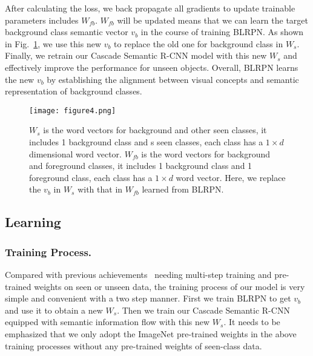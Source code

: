 \documentclass[runningheads]{llncs}
\begin{document}
After calculating the loss, we back propagate all gradients to update trainable parameters includes $W_{fb}$. $W_{fb}$ will be updated means that we can learn the target background class semantic vector $v_b$ in the course of training BLRPN. As shown in Fig.~\ref{fig:figure4}, we use this new $v_b$ to replace the old one for background class in $W_{s}$. Finally, we retrain our Cascade Semantic R-CNN model with this new $W_{s}$ and effectively improve the performance for unseen objects. Overall, BLRPN learns the new $v_b$ by establishing the alignment between visual concepts and semantic representation of background classes.
\begin{figure}[tbp]
\centering
\texttt{[image: figure4.png]}
\caption{$W_s$ is the word vectors for background and other seen classes, it includes 1 background class and s seen classes, each class has a $1 \times d$  dimensional word vector. $W_{fb}$ is the word vectors for background and foreground classes, it includes 1 background class and 1 foreground class, each class has a $1 \times d$ word vector. Here, we replace the $v_b$ in $W_s$ with that in $W_{fb}$ learned from BLRPN.}
\label{fig:figure4}
\end{figure}
\subsection{Learning}
\subsubsection{Training Process.}
Compared with previous achievements~\cite{bansal2018zero,demirel2018zero,rahman2018zero,zhu2019zero} needing multi-step training and pre-trained weights on seen or unseen data, the training process of our model is very simple and convenient with a two step manner. First we train BLRPN to get $v_b$ and use it to obtain a new $W_s$. Then we train our Cascade Semantic R-CNN equipped with semantic information flow with this new $W_s$. It needs to be emphasized that we only adopt the ImageNet pre-trained weights in the above training processes without any pre-trained weights of seen-class data.
\end{document}
